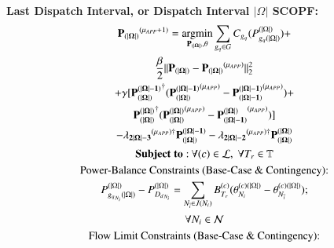 \documentclass[preprint,12pt,3p]{elsarticle}
\begin{document}
	\textbf{Last Dispatch Interval, or Dispatch Interval $|\Omega|$ SCOPF:}
	\begin{subequations}\label{Look-Ahead_General_Third_Interval_Angle}
		\begin{gather}
		\mathbf{P_{(|\Omega|)}}^{(\mu_{APP}+1)}= \argmin_{\mathbf{P_{(|\Omega|)}},\theta} \sum_{{g_q}\in G}C_{g_q}(P_{{g_q}(|\Omega|)}^{(|\Omega|)})+\notag\\ \frac{\beta}{2}||\mathbf{P_{(|\Omega|)}}-\mathbf{P_{(|\Omega|)}}^{(\mu_{APP})}||_2^2\notag\\+ \gamma[\mathbf{P_{(|\Omega|)}^{(|\Omega|-1)}}^{\dagger}(\mathbf{P_{(|\Omega|)}^{(|\Omega|-1)}}^{(\mu_{APP})}-\mathbf{P_{(|\Omega|-1)}^{(|\Omega|-1)}}^{(\mu_{APP})})+\notag\\\mathbf{P_{(|\Omega|)}^{(|\Omega|)}}^{\dagger}(\mathbf{P_{(|\Omega|)}^{(|\Omega|)}}^{(\mu_{APP})}-\mathbf{P_{(|\Omega|-1)}^{(|\Omega|)}}^{(\mu_{APP})})]\notag\\- \mathbf{\lambda_{2|\Omega|-3}}^{(\mu_{APP})\dagger}\mathbf{P_{(|\Omega|)}^{(|\Omega|-1)}}-\mathbf{\lambda_{2|\Omega|-2}}^{(\mu_{APP})\dagger}\mathbf{P_{(|\Omega|)}^{(|\Omega|)}}\label{first_Look-Ahead_General_Third_Interval_Angle}\\
		\mathbf{Subject\;to:}\:\forall(c)\in\mathcal{L},\;\forall T_r\in \mathbb{T}\notag\\
		\text{Power-Balance Constraints (Base-Case \& Contingency):}\notag\\
		P_{{g_q}_{N_i}(|\Omega|)}^{(|\Omega|)}-P_{{D_d}_{N_i}}^{(|\Omega|)}=\sum_{N_{\overline{i}}\in{J(N_i)}}B_{T_r}^{(c)}(\theta_{N_i}^{(c)(|\Omega|)}-\theta_{N_{\overline{i}}}^{(c)(|\Omega|)});\notag\\\forall{{N_i}\in\mathcal{N}}\label{secondA_Look-Ahead_General_Third_Interval_Angle}\\
		\text{Flow Limit Constraints (Base-Case \& Contingency):}\notag\\

\end{gather}
\end{subequations}
\end{document}
